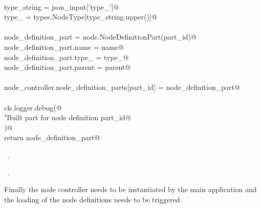 \documentclass[
    a4paper,      %
    10pt,         %
    openright,    %
    notitlepage,  %
    parskip=half, %
]{scrreprt}       %
\theoremstyle{definition}                    %
\begin{document}
\begin{flushleft}
\begin{minipage}{\linewidth}
\begin{list}{}{}
\mbox{}\lstinline@@\\
\mbox{}\lstinline@    type_string = json_input['type_']@\\
\mbox{}\lstinline@    type_ = types.NodeType[type_string.upper()]@\\
\mbox{}\lstinline@@\\
\mbox{}\lstinline@    node_definition_part = node.NodeDefinitionPart(part_id)@\\
\mbox{}\lstinline@    node_definition_part.name = name@\\
\mbox{}\lstinline@    node_definition_part.type_ = type_@\\
\mbox{}\lstinline@    node_definition_part.parent = parent@\\
\mbox{}\lstinline@@\\
\mbox{}\lstinline@    node_controller.node_definition_parts[part_id] = node_definition_part@\\
\mbox{}\lstinline@@\\
\mbox{}\lstinline@    cls.logger.debug(@\\
\mbox{}\lstinline@        "Built part for node definition %s",@\\
\mbox{}\lstinline@        part_id@\\
\mbox{}\lstinline@    )@\\
\mbox{}\lstinline@    return node_definition_part@\\
\mbox{}\lstinline@@{\NWsep}
\end{list}
\vspace{-1.5ex}
\footnotesize
\begin{list}{}{\setlength{\itemsep}{-\parsep}\setlength{\itemindent}{-\leftmargin}}
\item \NWtxtMacroDefBy\ .
\item \NWtxtMacroRefIn\ .

\item{}
\end{list}
\end{minipage}\vspace{4ex}
\end{flushleft}
Finally the node controller needs to be instantiated by the main application
and the loading of the node definitions needs to be triggered.
\end{document}
